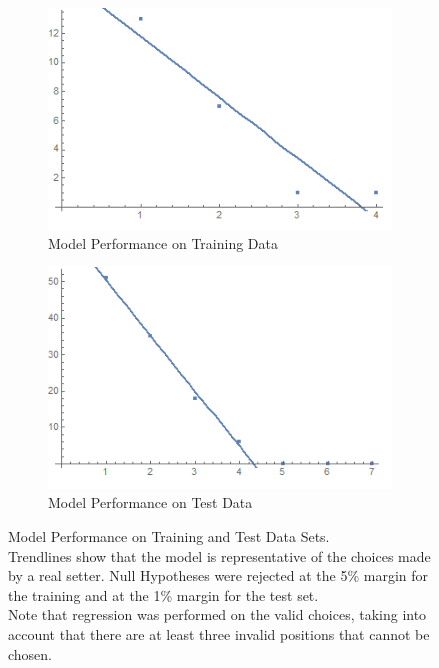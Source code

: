 \documentclass[main.tex]{subfiles}
\begin{document}
        \begin{figure}[h!]
          \begin{subfigure}{0.5\linewidth}
            \centering
            \includegraphics[width=0.80\linewidth]{figures/trainingGraph}
            \caption{Model Performance on Training Data}
            \label{fig:training}
          \end{subfigure}
          \begin{subfigure}{0.5\linewidth}
            \centering
            \includegraphics[width=0.80\linewidth]{figures/testGraph}
            \caption{Model Performance on Test Data}
            \label{fig:test}
          \end{subfigure}
          \caption{Model Performance on Training and Test Data Sets. \\
            Trendlines show that the model is representative of the choices made by a real setter. Null Hypotheses were rejected at the 5\% margin for the training and at the 1\% margin for the test set. \\
            Note that regression was performed on the valid choices, taking into account that there are at least three invalid positions that cannot be chosen.
            }
          \label{fig:analysis}
        \end{figure}
        
\end{document}
